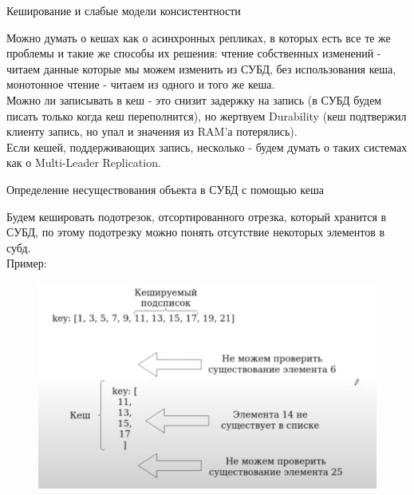     \begin{definition}
      Кеширование и слабые модели консистентности
    \end{definition}
    Можно думать о кешах как о асинхронных репликах, в которых есть все те же проблемы и такие же способы их решения: чтение собственных изменений - читаем данные которые мы можем изменить из СУБД, без использования кеша, монотонное чтение - читаем из одного и того же кеша. \\
    Можно ли записывать в кеш - это снизит задержку на запись (в СУБД будем писать только когда кеш переполнится), но жертвуем Durability (кеш подтвержил клиенту запись, но упал и значения из RAM'а потерялись).\\
    Если кешей, поддерживающих запись, несколько - будем думать о таких системах как о Multi-Leader Replication. \\
    \begin{definition}
      Определение несуществования объекта в СУБД с помощью кеша
    \end{definition}
    Будем кешировать подотрезок, отсортированного отрезка, который хранится в СУБД, по этому подотрезку можно понять отсутствие некоторых элементов в субд.\\
    Пример:\\
    \begin{figure}[h]
        \centering
        \includegraphics[scale = 0.5]{../assets/23.png}
        \caption{}
    \end{figure}

